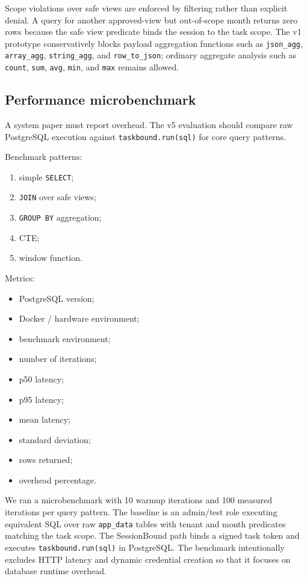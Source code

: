 \documentclass[
]{article}
\providecommand{\tightlist}{%
  \setlength{\itemsep}{0pt}\setlength{\parskip}{0pt}}
\begin{document}
Scope violations over safe views are enforced by filtering rather than
explicit denial. A query for another approved-view but out-of-scope
month returns zero rows because the safe view predicate binds the
session to the task scope. The v1 prototype conservatively blocks
payload aggregation functions such as \texttt{json\_agg},
\texttt{array\_agg}, \texttt{string\_agg}, and \texttt{row\_to\_json};
ordinary aggregate analysis such as \texttt{count}, \texttt{sum},
\texttt{avg}, \texttt{min}, and \texttt{max} remains allowed.

\hypertarget{performance-microbenchmark}{%
\subsection{Performance
microbenchmark}\label{performance-microbenchmark}}

A system paper must report overhead. The v5 evaluation should compare
raw PostgreSQL execution against \texttt{taskbound.run(sql)} for core
query patterns.

Benchmark patterns:

\begin{enumerate}
\def\labelenumi{\arabic{enumi}.}
\tightlist
\item
  simple \texttt{SELECT};
\item
  \texttt{JOIN} over safe views;
\item
  \texttt{GROUP\ BY} aggregation;
\item
  CTE;
\item
  window function.
\end{enumerate}

Metrics:

\begin{itemize}
\tightlist
\item
  PostgreSQL version;
\item
  Docker / hardware environment;
\item
  benchmark environment;
\item
  number of iterations;
\item
  p50 latency;
\item
  p95 latency;
\item
  mean latency;
\item
  standard deviation;
\item
  rows returned;
\item
  overhead percentage.
\end{itemize}

We ran a microbenchmark with 10 warmup iterations and 100 measured
iterations per query pattern. The baseline is an admin/test role
executing equivalent SQL over raw
\texttt{app\_data} tables with tenant and month predicates matching the
task scope. The SessionBound path binds a signed task token and executes
\texttt{taskbound.run(sql)} in PostgreSQL. The benchmark intentionally
excludes HTTP latency and dynamic credential creation so that it focuses
on database runtime overhead.
\end{document}
